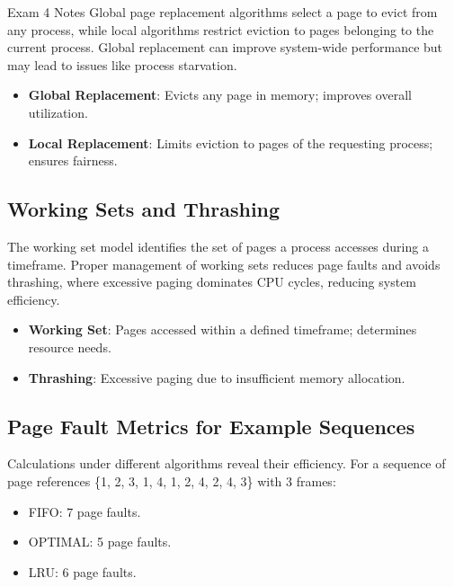 \begin{examnotes}{Exam 4 Notes}
    Global page replacement algorithms select a page to evict from any process, while local algorithms restrict eviction to pages belonging to the current process. Global replacement can improve system-wide 
    performance but may lead to issues like process starvation.
    
    \begin{highlight}
        \begin{itemize}
            \item \textbf{Global Replacement}: Evicts any page in memory; improves overall utilization.
            \item \textbf{Local Replacement}: Limits eviction to pages of the requesting process; ensures fairness.
        \end{itemize}
    \end{highlight}
    
    \subsection*{Working Sets and Thrashing}
    
    The working set model identifies the set of pages a process accesses during a timeframe. Proper management of working sets reduces page faults and avoids thrashing, where excessive paging dominates 
    CPU cycles, reducing system efficiency.
    
    \begin{highlight}
        \begin{itemize}
            \item \textbf{Working Set}: Pages accessed within a defined timeframe; determines resource needs.
            \item \textbf{Thrashing}: Excessive paging due to insufficient memory allocation.
        \end{itemize}
    \end{highlight}
    
    \subsection*{Page Fault Metrics for Example Sequences}
    
    Calculations under different algorithms reveal their efficiency. For a sequence of page references \{1, 2, 3, 1, 4, 1, 2, 4, 2, 4, 3\} with 3 frames:
    \begin{itemize}
        \item FIFO: 7 page faults.
        \item OPTIMAL: 5 page faults.
        \item LRU: 6 page faults.
    \end{itemize}
    

\end{examnotes}

